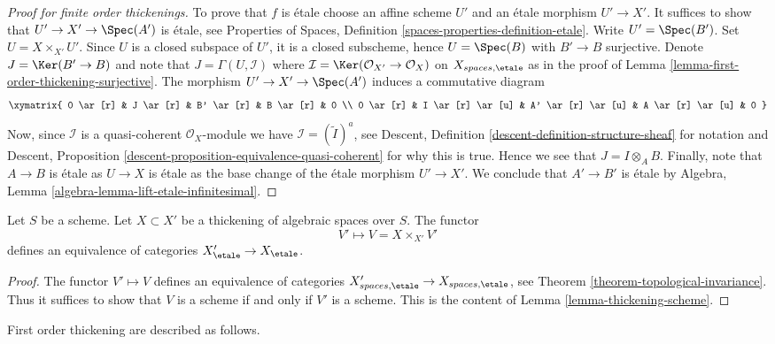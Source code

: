 \begin{proof}[Proof for finite order thickenings]
\medskip\noindent
To prove that $f$ is \'etale choose an affine scheme $U'$ and an
\'etale morphism $U' \to X'$. It suffices to show that
$U' \to X' \to \Spec(A')$ is \'etale, see
Properties of Spaces, Definition \ref{spaces-properties-definition-etale}.
Write $U' = \Spec(B')$. Set $U = X \times_{X'} U'$. Since $U$
is a closed subspace of $U'$, it is a closed subscheme, hence
$U = \Spec(B)$ with $B' \to B$ surjective. Denote
$J = \Ker(B' \to B)$ and note that $J = \Gamma(U, \mathcal{I})$
where $\mathcal{I} = \Ker(\mathcal{O}_{X'} \to \mathcal{O}_X)$
on $X_{spaces, \etale}$ as in the proof of
Lemma \ref{lemma-first-order-thickening-surjective}.
The morphism $U' \to X' \to \Spec(A')$ induces a commutative
diagram
$$
\xymatrix{
0 \ar[r] &
J \ar[r] &
B' \ar[r] &
B \ar[r] & 0 \\
0 \ar[r] &
I \ar[r] \ar[u] &
A' \ar[r] \ar[u] &
A \ar[r] \ar[u] & 0
}
$$
Now, since $\mathcal{I}$ is a quasi-coherent $\mathcal{O}_X$-module
we have $\mathcal{I} = (\widetilde I)^a$, see
Descent, Definition \ref{descent-definition-structure-sheaf}
for notation and
Descent, Proposition \ref{descent-proposition-equivalence-quasi-coherent}
for why this is true. Hence we see that $J = I \otimes_A B$.
Finally, note that $A \to B$ is \'etale as $U \to X$ is \'etale as
the base change of the \'etale morphism $U' \to X'$.
We conclude that $A' \to B'$ is \'etale by
Algebra, Lemma \ref{algebra-lemma-lift-etale-infinitesimal}.
\end{proof}

\begin{lemma}
\label{lemma-thickening-equivalence}
Let $S$ be a scheme. Let $X \subset X'$ be a thickening of algebraic spaces
over $S$. The functor
$$
V' \longmapsto V = X \times_{X'} V'
$$
defines an equivalence of categories
$X'_\etale \to X_\etale$.
\end{lemma}

\begin{proof}
The functor $V' \mapsto V$ defines an equivalence of categories
$X'_{spaces, \etale} \to X_{spaces, \etale}$, see
Theorem \ref{theorem-topological-invariance}.
Thus it suffices to show that $V$ is a scheme if and only if $V'$ is
a scheme. This is the content of
Lemma \ref{lemma-thickening-scheme}.
\end{proof}

\noindent
First order thickening are described as follows.

